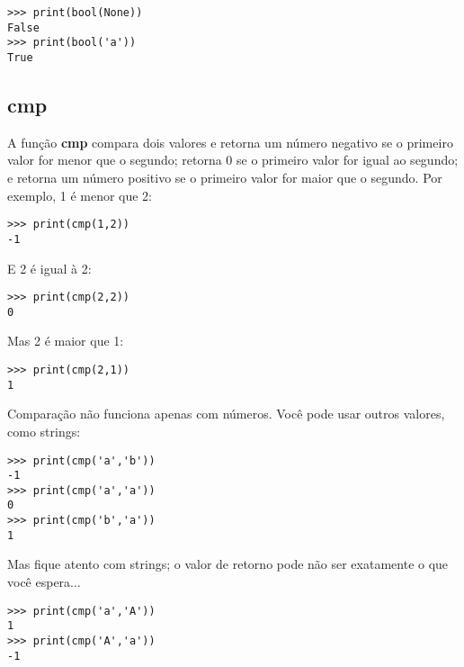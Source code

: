 \begin{listing}
\begin{verbatim}
>>> print(bool(None))
False
>>> print(bool('a'))
True 
\end{verbatim}
\end{listing}

\subsection*{cmp}

A função \textbf{cmp} compara dois valores e retorna um número negativo se o primeiro valor for menor que o segundo; retorna 0 se o primeiro valor for igual ao segundo; e retorna um número positivo se o primeiro valor for maior que o segundo. Por exemplo, 1 é menor que 2:

\begin{listing}
\begin{verbatim}
>>> print(cmp(1,2))
-1
\end{verbatim}
\end{listing}

\noindent
E 2 é igual à 2:

\begin{listing}
\begin{verbatim}
>>> print(cmp(2,2))
0
\end{verbatim}
\end{listing}

\noindent
Mas 2 é maior que 1:

\begin{listing}
\begin{verbatim}
>>> print(cmp(2,1))
1
\end{verbatim}
\end{listing}

\noindent
Comparação não funciona apenas com números. Você pode usar outros valores, como strings:

\begin{listing}
\begin{verbatim}
>>> print(cmp('a','b'))
-1
>>> print(cmp('a','a'))
0
>>> print(cmp('b','a'))
1
\end{verbatim}
\end{listing}

\noindent
Mas fique atento com strings; o valor de retorno pode não ser exatamente o que você espera$\ldots$

\begin{listing}
\begin{verbatim}
>>> print(cmp('a','A'))
1
>>> print(cmp('A','a'))
-1
\end{verbatim}
\end{listing}


